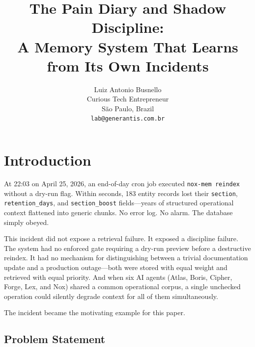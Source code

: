\documentclass{article}
\title{The Pain Diary and Shadow Discipline:\\A Memory System That Learns from Its Own Incidents}
\author{%
  Luiz Antonio Busnello \\
  Curious Tech Entrepreneur \\
  S\~{a}o Paulo, Brazil \\
  \texttt{lab@generantis.com.br} \\
}
\begin{document}
\raggedbottom

\maketitle

\begin{abstract}

\end{abstract}



\iffalse
\section{Introduction}

At 22:03 on April 25, 2026, an end-of-day cron job executed \texttt{nox-mem reindex}
without a dry-run flag. Within seconds, 183 entity records lost their \texttt{section},
\texttt{retention\_days}, and \texttt{section\_boost} fields---years of structured
operational context flattened into generic chunks. No error log. No alarm. The database
simply obeyed.

This incident did not expose a retrieval failure. It exposed a discipline failure. The
system had no enforced gate requiring a dry-run preview before a destructive reindex. It
had no mechanism for distinguishing between a trivial documentation update and a production
outage---both were stored with equal weight and retrieved with equal priority. And when six
AI agents (Atlas, Boris, Cipher, Forge, Lex, and Nox) shared a common operational corpus,
a single unchecked operation could silently degrade context for all of them simultaneously.

The incident became the motivating example for this paper.

\subsection{Problem Statement}
\end{document}
